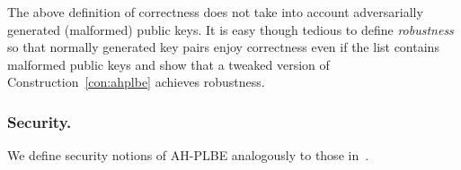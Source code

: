 

\noindent
{}
The above definition of correctness does not take into account
adversarially generated (malformed) public keys.
It is easy though tedious
to define \emph{robustness} so that normally generated key pairs enjoy correctness even if the list contains malformed public keys
and show that a tweaked version of Construction~\ref{con:ahplbe} achieves robustness.

\subsubsection{Security.}
We define security notions of AH-PLBE analogously to those in~\cite{EC:BonSahWat06}.




